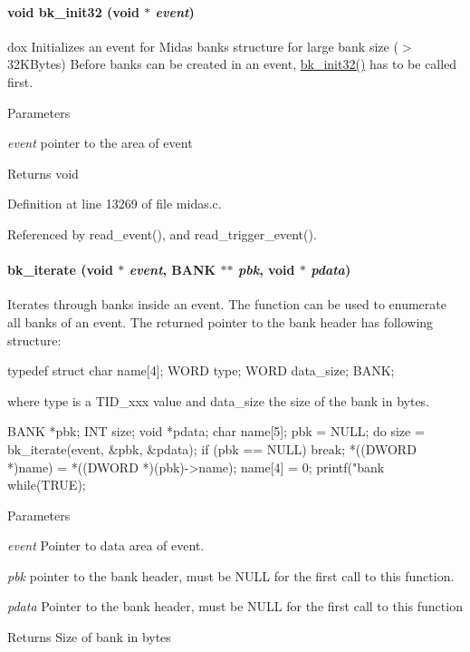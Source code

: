 \paragraph[{bk\_\-init32}]{\setlength{\rightskip}{0pt plus 5cm}void bk\_\-init32 (void $\ast$ {\em event})}\hfill\label{group__bkfunctionc_gae7cbf587db63fcdf66dd18b29f08b6d2}
dox Initializes an event for Midas banks structure for large bank size ($>$ 32KBytes) Before banks can be created in an event, \hyperlink{group__bkfunctionc_gae7cbf587db63fcdf66dd18b29f08b6d2}{bk\_\-init32()} has to be called first. 
\begin{DoxyParams}{Parameters}
\item[{\em event}]pointer to the area of event \end{DoxyParams}
\begin{DoxyReturn}{Returns}
void 
\end{DoxyReturn}


Definition at line 13269 of file midas.c.

Referenced by read\_\-event(), and read\_\-trigger\_\-event().
\paragraph[{bk\_\-iterate}]{ bk\_\-iterate (void $\ast$ {\em event}, \/  {\bf BANK} $\ast$$\ast$ {\em pbk}, \/  void $\ast$ {\em pdata})}\hfill\label{group__bkfunctionc_gab6012589013da85b128d8443501a4a44}
Iterates through banks inside an event. The function can be used to enumerate all banks of an event. The returned pointer to the bank header has following structure: 
\begin{DoxyCode}
typedef struct {
char   name[4];
WORD   type;
WORD   data_size;
} BANK;
\end{DoxyCode}
 where type is a TID\_\-xxx value and data\_\-size the size of the bank in bytes. 
\begin{DoxyCode}
BANK *pbk;
INT  size;
void *pdata;
char name[5];
pbk = NULL;
do
{
 size = bk_iterate(event, &pbk, &pdata);
 if (pbk == NULL)
  break;
 *((DWORD *)name) = *((DWORD *)(pbk)->name);
 name[4] = 0;
 printf("bank %
} while(TRUE);
\end{DoxyCode}
 
\begin{DoxyParams}{Parameters}
\item[{\em event}]Pointer to data area of event. \item[{\em pbk}]pointer to the bank header, must be NULL for the first call to this function. \item[{\em pdata}]Pointer to the bank header, must be NULL for the first call to this function \end{DoxyParams}
\begin{DoxyReturn}{Returns}
Size of bank in bytes 
\end{DoxyReturn}


